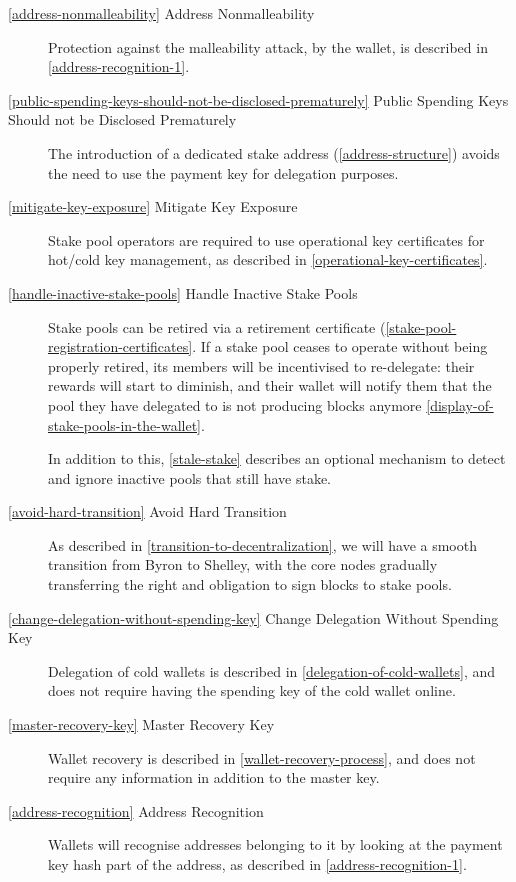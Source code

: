 \documentclass[11pt,a4paper,dvipsnames,twosided]{article}
\begin{document}
\begin{description}
\item[\cref{address-nonmalleability} Address Nonmalleability] Protection against
  the malleability attack, by the wallet, is described in
  \cref{address-recognition-1}.

\item[\cref{public-spending-keys-should-not-be-disclosed-prematurely}
  Public Spending Keys Should not be Disclosed Prematurely] The
  introduction of a dedicated stake address (\cref{address-structure})
  avoids the need to use the payment key for delegation purposes.

\item[\cref{mitigate-key-exposure} Mitigate Key Exposure] Stake pool operators
  are required to use operational key certificates for hot/cold key management,
  as described in \cref{operational-key-certificates}.

\item[\cref{handle-inactive-stake-pools} Handle Inactive Stake Pools]
  Stake pools can be retired via a retirement certificate
  (\cref{stake-pool-registration-certificates}. If a stake pool
  ceases to operate without being properly retired, its members will be
  incentivised to re-delegate: their rewards will start to diminish, and their
  wallet will notify them that the pool they have delegated to is not producing
  blocks anymore \cref{display-of-stake-pools-in-the-wallet}.

  In addition to this, \cref{stale-stake} describes an optional mechanism to
  detect and ignore inactive pools that still have stake.

\item[\cref{avoid-hard-transition} Avoid Hard Transition] As described
  in \cref{transition-to-decentralization}, we will have a smooth
  transition from Byron to Shelley, with the core nodes gradually
  transferring the right and obligation to sign blocks to stake pools.

\item[\cref{change-delegation-without-spending-key} Change Delegation
  Without Spending Key] Delegation of cold wallets is described in
  \cref{delegation-of-cold-wallets}, and does not require having the
  spending key of the cold wallet online.

\item[\cref{master-recovery-key} Master Recovery Key] Wallet recovery
  is described in \cref{wallet-recovery-process}, and does not require
  any information in addition to the master key.

\item[\cref{address-recognition} Address Recognition] Wallets will
  recognise addresses belonging to it by looking at the payment key
  hash part of the address, as described in
  \cref{address-recognition-1}.


\end{description}
\end{document}
